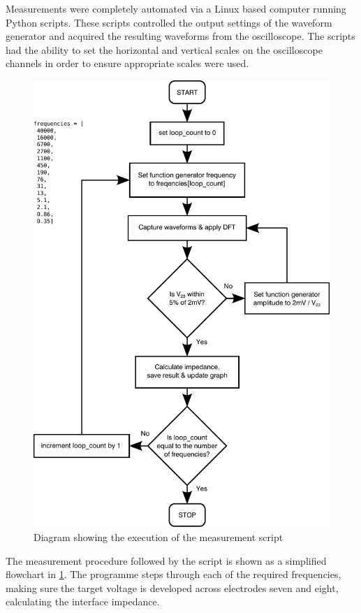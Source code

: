   Measurements were completely automated via a Linux based computer running Python scripts.
  These scripts controlled the output settings of the waveform generator and acquired the resulting waveforms from the oscilloscope.
  The scripts had the ability to set the horizontal and vertical scales on the oscilloscope channels in order to ensure appropriate scales were used.

  \begin{figure}
      \centering
      \includegraphics[width=\textwidth]{content/pt2/graphics/measurementFlowchart}
      \caption{\label{fig:creatingCSF_pythonFlowchart}Diagram showing the execution of the measurement script}
  \end{figure}

  The measurement procedure followed by the script is shown as a simplified flowchart in \cref{fig:creatingCSF_pythonFlowchart}.
  The programme steps through each of the required frequencies, making sure the target voltage is developed across electrodes seven and eight, calculating the interface impedance.


